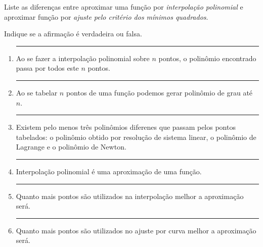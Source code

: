 %
%
%
%
%
%
%
%
%
%
%
%
%
%


%
%
%
%
%
%
%

\begin{ex}
Liste as diferenças entre aproximar uma função por \emph{interpolação polinomial} e aproximar função por \emph{ajuste pelo critério dos mínimos quadrados}.
\end{ex}




\begin{ex} 
Indique se a afirmação é verdadeira ou falsa.


\begin{enumerate}

\item\label{vf} \rule{1cm}{0.1pt} Ao se fazer a interpolação polinomial sobre $n$ pontos, o polinômio encontrado passa por todos este $n$ pontos.
\item \rule{1cm}{0.1pt} Ao se tabelar $n$ pontos de uma função podemos gerar polinômio de grau até $n$.
\item \rule{1cm}{0.1pt} Existem pelo menos três polinômios diferenes que passam pelos pontos tabelados: o polinômio obtido por resolução de sistema linear, o polinômio de Lagrange e o polinômio de Newton.
\item \rule{1cm}{0.1pt} Interpolação polinomial é uma aproximação de uma função.
\item \rule{1cm}{0.1pt} Quanto mais pontos são utilizados na interpolação melhor a aproximação será.
\item\label{vff} \rule{1cm}{0.1pt} Quanto mais pontos são utilizados no ajuste por curva melhor a aproximação será. 
\end{enumerate}
\end{ex}

